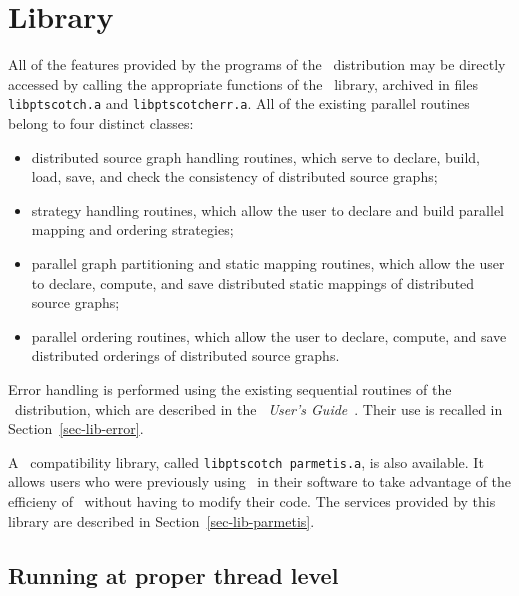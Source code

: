 
\section{Library}
\label{sec-lib}

All of the features provided by the programs of the
\ptscotch\ distribution may be directly accessed by calling
the appropriate functions of the \libscotch\ library, archived
in files {\tt libptscotch.a} and {\tt libptscotcherr.a}.
All of the existing parallel routines belong to four distinct classes:
\begin{itemize}
\item
distributed source graph handling routines, which serve to declare,
build, load, save, and check the consistency of distributed source
graphs;
\item
strategy handling routines, which allow the user to declare and build
parallel mapping and ordering strategies;
\item
parallel graph partitioning and static mapping routines, which allow
the user to declare, compute, and save distributed static mappings of
distributed source graphs;
\item
parallel ordering routines, which allow the user to declare, compute,
and save distributed orderings of distributed source graphs.
\end{itemize}
Error handling is performed using the existing sequential routines of
the \scotch\ distribution, which are described in the
{\it\scotch\ User's Guide}~\scotchcitesuser. Their use is recalled in
Section~\ref{sec-lib-error}.

A \parmetis\ compatibility library, called {\tt lib\lbo ptscotch\lbo
parmetis.a}, is also available. It allows users who were previously
using \parmetis\ in their software to take advantage of the efficieny
of \ptscotch\ without having to modify their code. The services
provided by this library are described in
Section~\ref{sec-lib-parmetis}.

\subsection{Running at proper thread level}
\label{sec-lib-thread}

